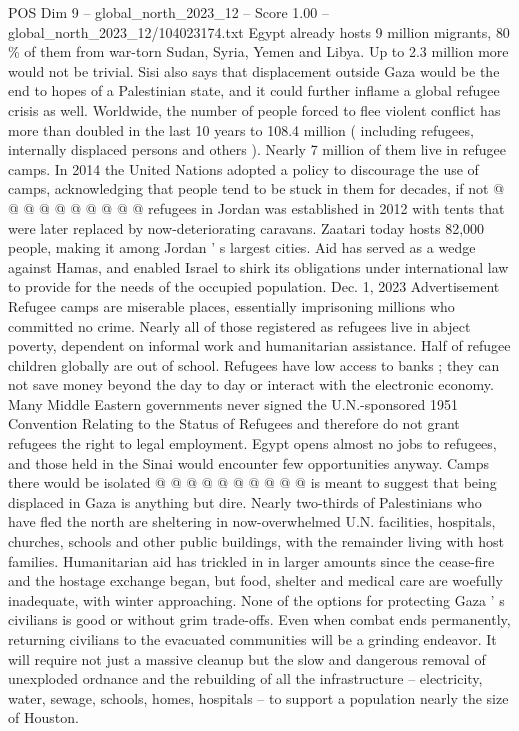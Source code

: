 \begin{textsample}{POS Dim 9 – global\_north\_2023\_12 – Score 1.00 – global\_north\_2023\_12/104023174.txt}
Egypt already hosts 9 million migrants, 80 \% of them from war-torn Sudan, Syria, Yemen and Libya.
Up to 2.3 million more would not be trivial.
Sisi also says that displacement outside Gaza would be the end to hopes of a Palestinian state, and it could further inflame a global refugee crisis as well.
Worldwide, the number of people forced to flee violent conflict has more than doubled in the last 10 years to 108.4 million ( including refugees, internally displaced persons and others ).
Nearly 7 million of them live in refugee camps.
In 2014 the United Nations adopted a policy to discourage the use of camps, acknowledging that people tend to be stuck in them for decades, if not @ @ @ @ @ @ @ @ @ @ refugees in Jordan was established in 2012 with tents that were later replaced by now-deteriorating caravans.
Zaatari today hosts 82,000 people, making it among Jordan ' s largest cities.
Aid has served as a wedge against Hamas, and enabled Israel to shirk its obligations under international law to provide for the needs of the occupied population.
Dec. 1, 2023 Advertisement Refugee camps are miserable places, essentially imprisoning millions who committed no crime.
Nearly all of those registered as refugees live in abject poverty, dependent on informal work and humanitarian assistance.
Half of refugee children globally are out of school.
Refugees have low access to banks ; they can not save money beyond the day to day or interact with the electronic economy.
Many Middle Eastern governments never signed the U.N.-sponsored 1951 Convention Relating to the Status of Refugees and therefore do not grant refugees the right to legal employment.
Egypt opens almost no jobs to refugees, and those held in the Sinai would encounter few opportunities anyway.
Camps there would be isolated @ @ @ @ @ @ @ @ @ @ is meant to suggest that being displaced in Gaza is anything but dire.
Nearly two-thirds of Palestinians who have fled the north are sheltering in now-overwhelmed U.N. facilities, hospitals, churches, schools and other public buildings, with the remainder living with host families.
Humanitarian aid has trickled in in larger amounts since the cease-fire and the hostage exchange began, but food, shelter and medical care are woefully inadequate, with winter approaching.
None of the options for protecting Gaza ' s civilians is good or without grim trade-offs.
Even when combat ends permanently, returning civilians to the evacuated communities will be a grinding endeavor.
It will require not just a massive cleanup but the slow and dangerous removal of unexploded ordnance and the rebuilding of all the infrastructure -- electricity, water, sewage, schools, homes, hospitals -- to support a population nearly the size of Houston.

\end{textsample}

